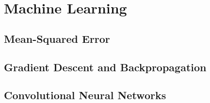 \chapter{Machine Learning}

\section{Mean-Squared Error}
\TODO

\section{Gradient Descent and Backpropagation}
\TODO

\section{Convolutional Neural Networks}
\TODO
